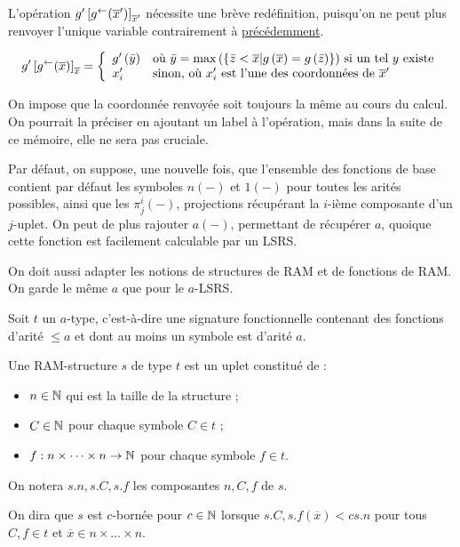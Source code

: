 			\begin{remark}
				L'opération $g'\left[ g^{\leftarrow}(\overline{x}') \right]_{\overline{x}'}$ nécessite une brève redéfinition, puisqu'on ne peut plus renvoyer l'unique variable contrairement à \hyperref[def:app_bornee_eq_pred]{précédemment}. 
				
				\[
					g'\left[ g^{\leftarrow}(\overline{x}) \right]_{\overline{x}} = \left\lbrace \begin{array}{ll} 
													g'\left( \bar{y} \right) & \text{où $\bar{y} = \max\left( \left\lbrace \bar{z} < \overline{x} | g\left( \overline{x} \right) = g\left( \bar{z} \right) \right\rbrace \right)$ si un tel $y$ existe} \\
													x'_i & \text{sinon, où $x'_i$ est l'une des coordonnées de $\overline{x}'$}
												 \end{array} \right.
				\]
				
				On impose que la coordonnée renvoyée soit toujours la même au cours du calcul. On pourrait la préciser en ajoutant un label à l'opération, mais dans la suite de ce mémoire, elle ne sera pas cruciale.
			\end{remark}
			
			\begin{remark}
				\label{rk:fonctions_de_base_LSRS}
				Par défaut, on suppose, une nouvelle fois, que l'ensemble des fonctions de base contient par défaut les symboles $n(-)$ et $1(-)$ pour toutes les arités possibles, ainsi que les $\pi^i_j(-)$, projections récupérant la $i$-ième composante d'un $j$-uplet. On peut de plus rajouter $a(-)$, permettant de récupérer $a$, quoique cette fonction est facilement calculable par un LSRS.
			\end{remark}
			
			On doit aussi adapter les notions de structures de RAM et de fonctions de RAM. On garde le même $a$ que pour le $a$-LSRS.
			
			\begin{definition}
				\label{def:RAM_data_structures_a}
				Soit $t$ un $a$-type, c'est-à-dire une signature fonctionnelle contenant des fonctions d'arité $\leqslant a$ et dont au moins un symbole est d'arité $a$. 
				
				Une RAM-structure $s$ de type $t$ est un uplet constitué de :
				\begin{itemize}[itemsep=-1mm]
					\item 	$n \in \mathbb{N}$ qui est la taille de la structure ;
					\item 	$C \in \mathbb{N}$ pour chaque symbole $C \in t$ ;
					\item 	$f : n\times \dots \times n \to \mathbb{N}$ pour chaque symbole $f \in t$.
				\end{itemize}
				
				On notera $s.n, s.C, s.f$ les composantes $n, C, f$ de $s$.
				
				On dira que $s$ est $c$-bornée pour $c\in\mathbb{N}$ lorsque $s.C, s.f\left(\overline{x}\right) < c s.n$ pour tous $C, f \in t$ et $\overline{x} \in n\times \dots \times n$.
			\end{definition}
			
